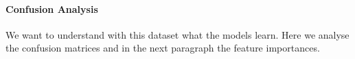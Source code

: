 \paragraph{Confusion Analysis}

We want to understand with this dataset what the models learn. Here we analyse the confusion matrices and in the next paragraph the feature importances.









